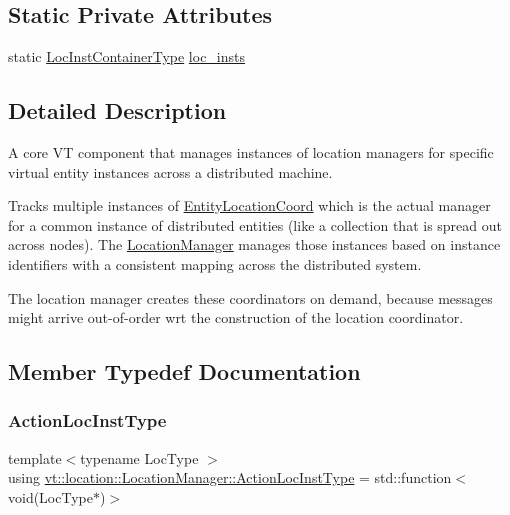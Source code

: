 \subsection*{Static Private Attributes}
\begin{DoxyCompactItemize}
\item 
static \hyperlink{structvt_1_1location_1_1_location_manager_adf4df6480ad89271a802d6d59bcf424e}{Loc\+Inst\+Container\+Type} \hyperlink{structvt_1_1location_1_1_location_manager_ae1f3b1c4bf75a14fce51a284bd692fe3}{loc\+\_\+insts}
\end{DoxyCompactItemize}


\subsection{Detailed Description}
A core VT component that manages instances of location managers for specific virtual entity instances across a distributed machine. 

Tracks multiple instances of {\ttfamily \hyperlink{structvt_1_1location_1_1_entity_location_coord}{Entity\+Location\+Coord}} which is the actual manager for a common instance of distributed entities (like a collection that is spread out across nodes). The {\ttfamily \hyperlink{structvt_1_1location_1_1_location_manager}{Location\+Manager}} manages those instances based on instance identifiers with a consistent mapping across the distributed system.

The location manager creates these coordinators on demand, because messages might arrive out-\/of-\/order wrt the construction of the location coordinator. 

\subsection{Member Typedef Documentation}
\mbox{\label{structvt_1_1location_1_1_location_manager_a6de3841092c537efc5fb8376128bfe18}} 
\subsubsection{\texorpdfstring{Action\+Loc\+Inst\+Type}{ActionLocInstType}}
{\footnotesize\ttfamily template$<$typename Loc\+Type $>$ \\
using \hyperlink{structvt_1_1location_1_1_location_manager_a6de3841092c537efc5fb8376128bfe18}{vt\+::location\+::\+Location\+Manager\+::\+Action\+Loc\+Inst\+Type} =  std\+::function$<$void(Loc\+Type$\ast$)$>$}

